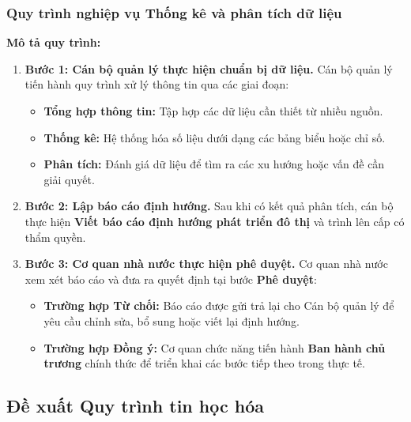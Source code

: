 \subsubsection{ Quy trình nghiệp vụ Thống kê và phân tích dữ liệu}

\textbf{Mô tả quy trình:}
\begin{enumerate}
    \item \textbf{Bước 1: Cán bộ quản lý thực hiện chuẩn bị dữ liệu.} Cán bộ quản lý tiến hành quy trình xử lý thông tin qua các giai đoạn:
    \begin{itemize}
        \item \textbf{Tổng hợp thông tin:} Tập hợp các dữ liệu cần thiết từ nhiều nguồn.
        \item \textbf{Thống kê:} Hệ thống hóa số liệu dưới dạng các bảng biểu hoặc chỉ số.
        \item \textbf{Phân tích:} Đánh giá dữ liệu để tìm ra các xu hướng hoặc vấn đề cần giải quyết.
    \end{itemize}
    
    \item \textbf{Bước 2: Lập báo cáo định hướng.} Sau khi có kết quả phân tích, cán bộ thực hiện \textbf{Viết báo cáo định hướng phát triển đô thị} và trình lên cấp có thẩm quyền.
    
    \item \textbf{Bước 3: Cơ quan nhà nước thực hiện phê duyệt.} Cơ quan nhà nước xem xét báo cáo và đưa ra quyết định tại bước \textbf{Phê duyệt}:
    \begin{itemize}
        \item \textbf{Trường hợp Từ chối:} Báo cáo được gửi trả lại cho Cán bộ quản lý để yêu cầu chỉnh sửa, bổ sung hoặc viết lại định hướng.
        \item \textbf{Trường hợp Đồng ý:} Cơ quan chức năng tiến hành \textbf{Ban hành chủ trương} chính thức để triển khai các bước tiếp theo trong thực tế.
    \end{itemize}
\end{enumerate}
\subsection{Đề xuất Quy trình tin học hóa}
